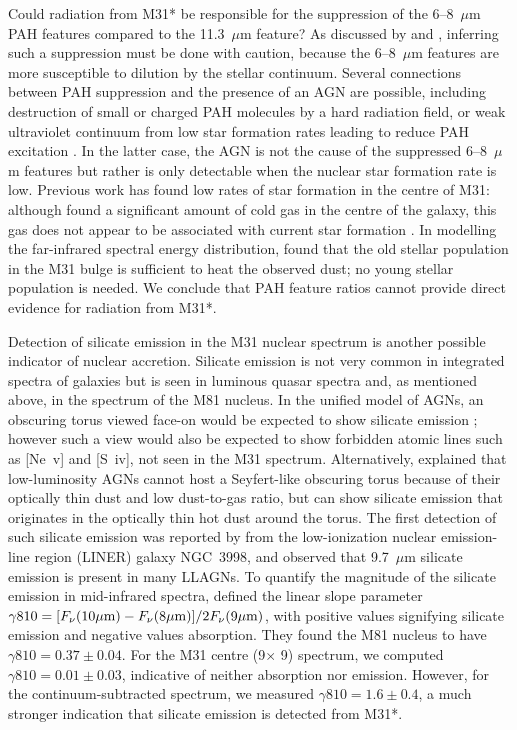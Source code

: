Could radiation from M31* be responsible for the suppression of the  6--8~$\mu$m PAH features compared
to the 11.3~$\mu$m feature?
As discussed by  \citet{Smith:2007lr} and \citet{Smith2010}, inferring such a suppression must be done with caution, 
because the 6--8~$\mu$m features are more susceptible to dilution by the stellar continuum. 
Several connections between PAH suppression and the presence of an AGN are possible, including destruction of small 
or charged PAH molecules by a hard radiation field, or weak ultraviolet continuum from low star formation rates 
leading to reduce PAH excitation \citep{Smith:2007lr}.  In the latter case, the AGN is not the cause of
the suppressed  6--8~$\mu$m features but rather is only detectable when the nuclear star formation rate is low.
Previous work has found low rates of star formation in the centre of M31: although \citet{Melchior2013} found a significant 
amount of cold gas in the centre of the galaxy, this gas does not appear to be associated with current star formation \citep[see also][]{Li09}.
In modelling the far-infrared spectral energy distribution, \cite{Groves2012} found that  
the old stellar population in the M31 bulge is sufficient  to heat the observed dust; no young stellar population is needed.
We conclude that PAH feature ratios cannot provide direct evidence for radiation from M31*.


Detection of silicate emission in the M31 nuclear spectrum is another possible indicator of nuclear accretion.
Silicate emission is not very common in integrated spectra of galaxies \citep{Spoon2007} but is seen in luminous 
quasar spectra \citep{Hill14} and, as mentioned above, in the spectrum of the M81 nucleus. 
In the unified model of AGNs, an obscuring torus viewed face-on would be expected to show silicate emission
\citep{AGNtypes1995, AGNref}; however such a view would also be expected to show forbidden atomic lines such as [Ne~{\sc v}] and [S~{\sc iv}],
not seen in the M31 spectrum. Alternatively, \citet{Mason2012} explained that low-luminosity AGNs cannot 
host a Seyfert-like obscuring torus because of their optically thin dust and low dust-to-gas ratio, but can show
silicate emission that originates in the optically thin hot dust around the torus.  The first detection of such silicate emission was 
reported by \citet{Sturm2005} from the low-ionization nuclear emission-line region (LINER) galaxy NGC~3998, and 
\citealt{Mason2012}  observed that  9.7~$\mu$m silicate emission is present in many LLAGNs. 
To quantify the magnitude of the silicate emission in mid-infrared spectra, \citet{Smith2010} defined
the linear slope parameter $\gamma810 =[F_{\nu}(10\mu{\rm m}) -F_{\nu}(8\mu{\rm m})]/2F_{\nu}(9\mu{\rm m})$,
with positive values signifying silicate emission and negative values absorption. They found the M81 nucleus to have
$\gamma810=0.37\pm0.04$. For the M31 centre (9\arcsec $\times$ 9\arcsec) spectrum, we computed  $\gamma810 =0.01\pm 0.03$,
indicative of neither absorption nor emission. However, for the continuum-subtracted spectrum, we measured   $\gamma810 =1.6\pm 0.4$,
a much stronger indication that silicate emission is detected from M31*.

